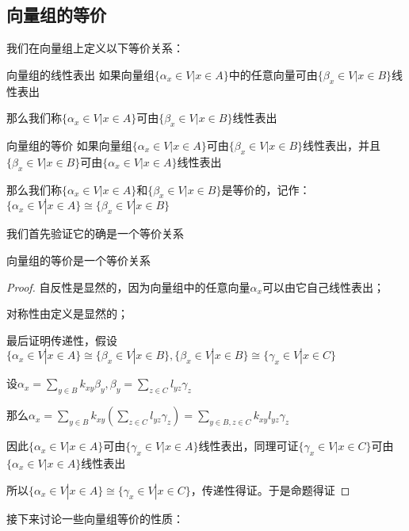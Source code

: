 \documentclass[12pt, a4paper, oneside, UTF8]{ctexbook}
\begin{document}
		\subsection{向量组的等价}
			我们在向量组上定义以下等价关系：
			\begin{defn}{向量组的线性表出}{}
				如果向量组$\{\alpha_x \in V| x \in A\}$中的任意向量可由$\{\beta_x \in V| x \in B\}$线性表出

				那么我们称$\{\alpha_x \in V| x \in A\}$可由$\{\beta _x \in V| x \in B\}$线性表出
			\end{defn}
			\begin{defn}{向量组的等价}{}
				如果向量组$\{\alpha_x \in V| x \in A\}$可由$\{\beta_x \in V| x \in B\}$线性表出，并且$\{\beta_x \in V| x \in B\}$可由$\{\alpha_x \in V| x \in A\}$线性表出

				那么我们称$\{\alpha_x \in V| x \in A\}$和$\{\beta_x \in V| x \in B\}$是等价的，记作：$\{\alpha_x \in V| x \in A\} \cong \{\beta_x \in V| x \in B\}$
			\end{defn}
			我们首先验证它的确是一个等价关系
			\begin{proposition}
				向量组的等价是一个等价关系
			\end{proposition}
			\begin{proof}
				自反性是显然的，因为向量组中的任意向量$\alpha_x$可以由它自己线性表出；

				对称性由定义是显然的；

				最后证明传递性，假设$\{\alpha_x \in V| x \in A\} \cong \{\beta _x \in V| x \in B\},\{\beta _x \in V| x \in B\}\cong\{\gamma _x \in V| x \in C\}$

				设$\alpha_x = \sum\limits_{y \in B} k_{xy} \beta_y,\beta_y = \sum\limits_{z \in C} l_{yz} \gamma_z$

				那么$\alpha_x = \sum\limits_{y \in B} k_{xy} \left(\sum\limits_{z \in C} l_{yz} \gamma_z\right)=\sum\limits_{y \in B,z\in C} k_{xy}l_{yz} \gamma_z$

				因此$\{\alpha_x \in V| x \in A\}$可由$\{\gamma _x \in V| x \in A\}$线性表出，同理可证$\{\gamma_x \in V| x \in C\}$可由$\{\alpha_x \in V| x \in A\}$线性表出
				
				所以$\{\alpha_x \in V| x \in A\} \cong \{\gamma_x \in V| x \in C\}$，传递性得证。于是命题得证
			\end{proof}
			接下来讨论一些向量组等价的性质：
\end{document}
